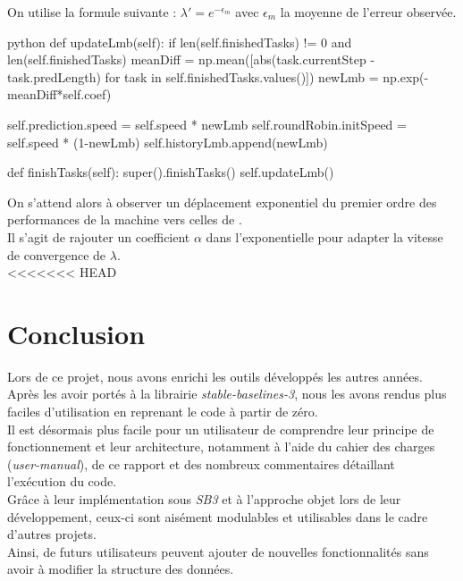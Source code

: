 \documentclass[12pt]{article}
\begin{document}
On utilise la formule suivante : $\lambda' = e^{-\epsilon_m}$ avec $\epsilon_m$ la moyenne de l'erreur observée. \\

\begin{mintedbox}{python}
    def updateLmb(self):
        if len(self.finishedTasks) != 0 and len(self.finishedTasks) %
            meanDiff = np.mean([abs(task.currentStep - task.predLength) for task in self.finishedTasks.values()])
            newLmb = np.exp(-meanDiff*self.coef)
    
            self.prediction.speed = self.speed * newLmb
            self.roundRobin.initSpeed = self.speed * (1-newLmb)
            self.historyLmb.append(newLmb)

    def finishTasks(self):
        super().finishTasks()
        self.updateLmb()
\end{mintedbox}

On s'attend alors à observer un déplacement exponentiel du premier ordre des performances de la machine vers celles de . \\

Il s'agit de rajouter un coefficient $\alpha$ dans l'exponentielle pour adapter la vitesse de convergence de $\lambda$. \\

\newpage
<<<<<<< HEAD
\section*{Conclusion}

Lors de ce projet, nous avons enrichi les outils développés les autres années. Après les avoir portés à la librairie \emph{stable-baselines-3}, nous les avons rendus plus faciles d'utilisation en reprenant le code à partir de zéro. \\

Il est désormais plus facile pour un utilisateur de comprendre leur principe de fonctionnement et leur architecture, notamment à l'aide du cahier des charges (\emph{user-manual}), de ce rapport et des nombreux commentaires détaillant l'exécution du code. \\

Grâce à leur implémentation sous \emph{SB3} et à l'approche objet lors de leur développement, ceux-ci sont aisément modulables et utilisables dans le cadre d'autres projets. \\

Ainsi, de futurs utilisateurs peuvent ajouter de nouvelles fonctionnalités sans avoir à modifier la structure des données. \\
\end{document}
